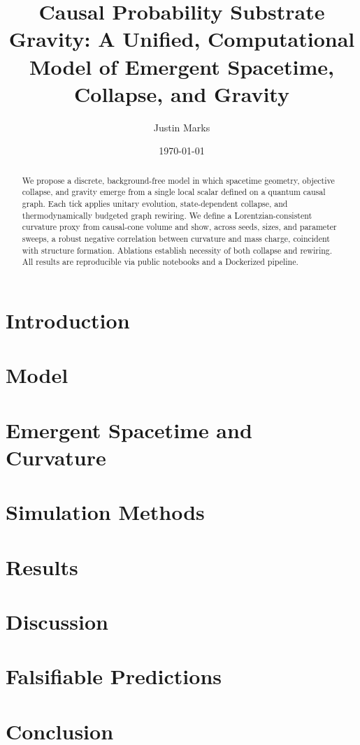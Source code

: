\documentclass[reprint,amsmath,amssymb,aps]{revtex4-2}
\begin{document}
\title{Causal Probability Substrate Gravity: A Unified, Computational Model of Emergent Spacetime, Collapse, and Gravity}

\author{Justin Marks}

\date{\today}

\begin{abstract}
We propose a discrete, background-free model in which spacetime geometry, objective collapse, and gravity emerge from a single local scalar defined on a quantum causal graph. Each tick applies unitary evolution, state-dependent collapse, and thermodynamically budgeted graph rewiring. We define a Lorentzian-consistent curvature proxy from causal-cone volume and show, across seeds, sizes, and parameter sweeps, a robust negative correlation between curvature and mass charge, coincident with structure formation. Ablations establish necessity of both collapse and rewiring. All results are reproducible via public notebooks and a Dockerized pipeline.
\end{abstract}

\maketitle

\section{Introduction}

\section{Model}

\section{Emergent Spacetime and Curvature}

\section{Simulation Methods}

\section{Results}

\section{Discussion}

\section{Falsifiable Predictions}

\section{Conclusion}



\end{document}
